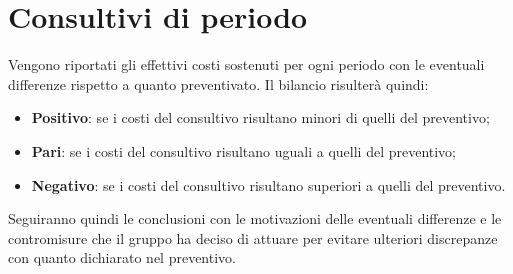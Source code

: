 \section{Consultivi di periodo}
Vengono riportati gli effettivi costi sostenuti per ogni periodo con le eventuali differenze rispetto a quanto preventivato. Il bilancio risulterà quindi:
\begin{itemize}
	\item \textbf{Positivo}: se i costi del consultivo risultano minori di quelli del preventivo;
	\item \textbf{Pari}: se i costi del consultivo risultano uguali a quelli del preventivo;
	\item \textbf{Negativo}: se i costi del consultivo risultano superiori a quelli del preventivo.
\end{itemize}
Seguiranno quindi le conclusioni con le motivazioni delle eventuali differenze e le contromisure che il gruppo ha deciso di attuare per evitare ulteriori discrepanze con quanto dichiarato nel preventivo.
